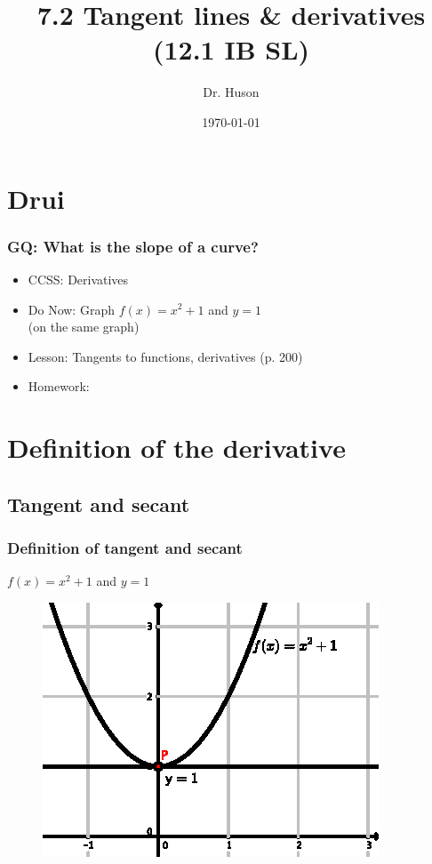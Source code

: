 \documentclass{beamer}
\title{7.2 Tangent lines \& derivatives (12.1 IB SL)}
\author{Dr. Huson}
\date{\today}
\begin{document}
\frame{\titlepage}

\section[Outline]{}
\frame{\tableofcontents}

\section{Drui}
\frame
{
  \frametitle{GQ: What is the slope of a curve?}

  \begin{itemize}
  \item CCSS: Derivatives
  \item Do Now: Graph $f(x)=x^2+1$ and $y=1$\\
  \qquad (on the same graph)
  \item Lesson: Tangents to functions, derivatives (p. 200)
  \item Homework:     
  \end{itemize}
}

\section{Definition of the derivative}
\subsection{Tangent and secant}
\frame
{
  \frametitle{Definition of tangent and secant}
  $f(x)=x^2+1$ and $y=1$
  \begin{figure}
    \centering
    \includegraphics{7-2a-tangent.eps}
    \end{figure}
}
\end{document}
